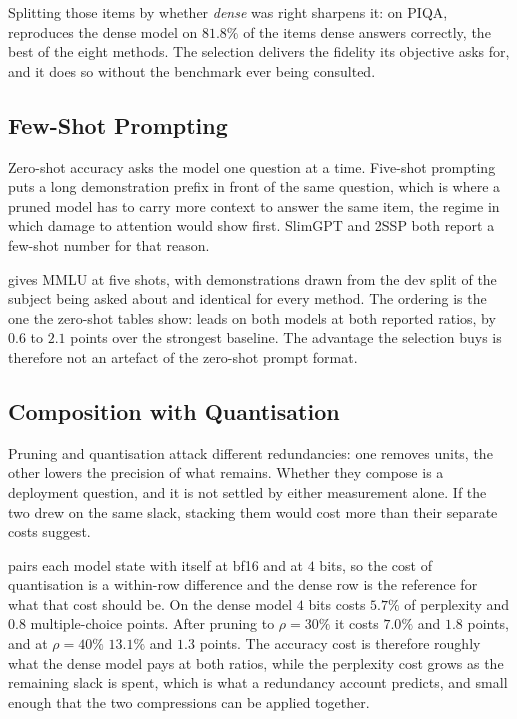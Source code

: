 Splitting those items by whether \emph{dense} was right sharpens it: on PIQA, \method reproduces the
dense model on $81.8\%$ of the items dense answers correctly, the best of the eight methods. The
selection delivers the fidelity its objective asks for, and it does so without the benchmark ever
being consulted.
\subsection{Few-Shot Prompting}
\label{app:fewshot}
Zero-shot accuracy asks the model one question at a time. Five-shot prompting puts a long
demonstration prefix in front of the same question, which is where a pruned model has to carry more
context to answer the same item, the regime in which damage to attention would show first.
SlimGPT and 2SSP both report a few-shot number for that reason.

 gives MMLU at five shots, with demonstrations drawn from the dev split of the
subject being asked about and identical for every method. The ordering is the one the zero-shot
tables show: \method leads on both models at both reported ratios, by $0.6$ to $2.1$ points over the
strongest baseline. The advantage the selection buys is therefore not an artefact of the zero-shot
prompt format.

\begin{table}[htbp]
\centering
\caption{\textbf{MMLU at five shots} (\%). Demonstrations come from the dev split of each subject
and are identical for every method; dense accuracy in grey.}
\label{tab:fewshot}

\end{table}

\subsection{Composition with Quantisation}
\label{app:quant}
Pruning and quantisation attack different redundancies: one removes units, the other lowers the
precision of what remains. Whether they compose is a deployment question, and it is not settled by
either measurement alone. If the two drew on the same slack, stacking them would cost more than
their separate costs suggest.

 pairs each model state with itself at bf16 and at $4$ bits, so the cost of
quantisation is a within-row difference and the dense row is the reference for what that cost should
be. On the dense model $4$ bits costs $5.7\%$ of perplexity and $0.8$ multiple-choice points. After
pruning to $\rho{=}30\%$ it costs $7.0\%$ and $1.8$ points, and at $\rho{=}40\%$ $13.1\%$ and $1.3$
points. The accuracy cost is therefore roughly what the dense model pays at both ratios, while the
perplexity cost grows as the remaining slack is spent, which is what a redundancy account
predicts, and small enough that the two compressions can be applied together.

